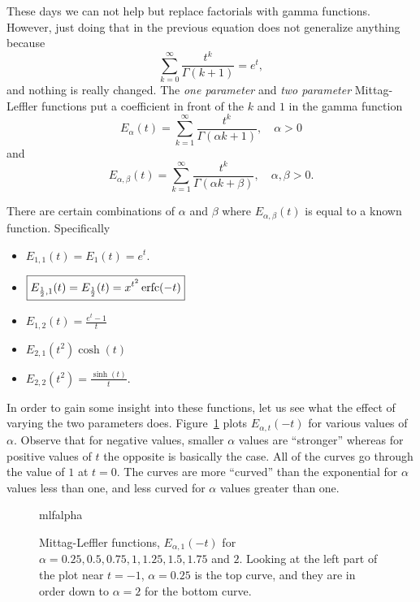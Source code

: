 These days we can not help but replace factorials with gamma functions. However, just doing that in the previous equation does not generalize anything because
\begin{equation*}
  \sum_{k=0}^\infty \frac{t^k}{\Gamma \left( k + 1 \right)} = e^t,
\end{equation*}
and nothing is really changed. The \emph{one parameter} and \emph{two parameter} Mittag-Leffler functions put a coefficient in front of the $k$ and $1$ in the gamma function
\begin{equation}
  \boxed{ E_\alpha(t) = \sum_{k=1}^\infty \frac{t^k}{\Gamma \left( \alpha k + 1 \right)}, \quad \alpha > 0 }
  \label{eq:mlone}
\end{equation}
and
\begin{equation}
  \boxed{  E_{\alpha, \beta}(t) = \sum_{k=1}^\infty \frac{t^k}{\Gamma \left( \alpha k + \beta \right)}, \quad \alpha, \beta > 0. }
  \label{eq:mltwo}
\end{equation}

There are certain combinations of $\alpha$ and $\beta$ where $E_{\alpha,\beta}(t)$ is equal to a known function. Specifically
\begin{itemize}
  \item $\boxed{ E_{1,1}(t) = E_1(t) = e^t. }$
  \item $\boxed{ E_{\frac{1}{2},1} (t) = E_\frac{1}{2}(t) = x^{t^2} \operatorname{erfc}(-t)  }$
  \item $\boxed{ E_{1,2}(t) = \frac{e^t - 1}{t}  }$
  \item $\boxed{ E_{2,1}(t^2) \cosh(t) }$
  \item $\boxed{ E_{2,2 }(t^2) = \frac{\sinh(t)}{t}. }$
\end{itemize}

In order to gain some insight into these functions, let us see what the effect of varying the two parameters does. Figure~\ref{fig:mlfalpha} plots $E_{\alpha,t}(-t)$ for various values of $\alpha$. Observe that for negative values, smaller $\alpha$ values are ``stronger'' whereas for positive values of $t$ the opposite is basically the case. All of the curves go through the value of $1$ at $t=0$. The curves are more ``curved'' than the exponential for $\alpha$ values less than one, and less curved for $\alpha$ values greater than one.

\begin{figure}
  \centering
  {mlfalpha}
  \caption{Mittag-Leffler functions, $E_{\alpha,1}(-t)$ for $\alpha = 0.25, 0.5, 0.75, 1, 1.25, 1.5, 1.75$ and $2$. Looking at the left part of the plot near $t = -1$, $\alpha = 0.25$ is the top curve, and they are in order down to $\alpha = 2$ for the bottom curve.}
  \label{fig:mlfalpha}
\end{figure}

